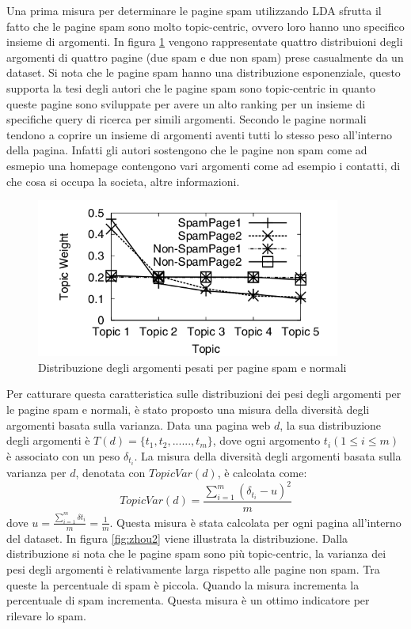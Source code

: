 Una prima misura per determinare le pagine spam utilizzando LDA sfrutta il fatto che le pagine spam sono molto topic-centric, ovvero loro hanno uno specifico insieme di argomenti. In figura \ref{fig:zhou1} vengono rappresentate quattro distribuioni degli argomenti di quattro pagine (due spam e due non spam) prese casualmente da un dataset. Si nota che le pagine spam hanno una distribuzione esponenziale, questo supporta la tesi degli autori che le pagine spam sono topic-centric in quanto queste pagine sono sviluppate per avere un alto ranking per un insieme di  specifiche query di ricerca per simili argomenti. Secondo le pagine normali tendono a coprire un insieme di argomenti aventi tutti lo stesso peso all'interno della pagina. Infatti gli autori sostengono che le pagine non spam come ad esmepio una homepage contengono vari argomenti come ad esempio i contatti, di che cosa si occupa la societa, altre informazioni.
\begin{figure}
\centering
\includegraphics[width=10cm]{immagini/zhou/immagine1.png}
\caption{Distribuzione degli argomenti pesati per pagine spam e normali}
\label{fig:zhou1}
\end{figure}
Per catturare questa caratteristica sulle distribuzioni dei pesi degli argomenti per le pagine spam e normali, è stato proposto una misura della  diversità degli argomenti basata sulla varianza. Data una pagina web \(d\), la sua distribuzione degli argomenti è \(T(d)=\{t_1,t_2,......,t_m\}\), dove ogni argomento \(t_i (1 \leq i \leq m)\) è associato con un peso \(\delta_{t_i}\). La misura della diversità degli argomenti basata sulla varianza per \(d\), denotata con \(TopicVar(d)\), è calcolata come:
\begin{equation}
TopicVar(d)=\frac{\sum_{i=1}^m (\delta_{t_i}-u)^2}{m}
\end{equation}
dove \(u=\frac{\sum_{i=1}^m\delta{t_i}}{m}=\frac{1}{m}\). Questa misura è stata calcolata per ogni pagina all'interno del dataset.
In figura \ref{fig:zhou2} viene illustrata la distribuzione. Dalla distribuzione si nota che le pagine spam sono più topic-centric, la varianza dei pesi degli argomenti è relativamente larga rispetto alle pagine non spam. Tra queste la percentuale di spam è piccola. Quando la misura incrementa la percentuale di spam incrementa. Questa misura è un ottimo indicatore per rilevare lo spam.
